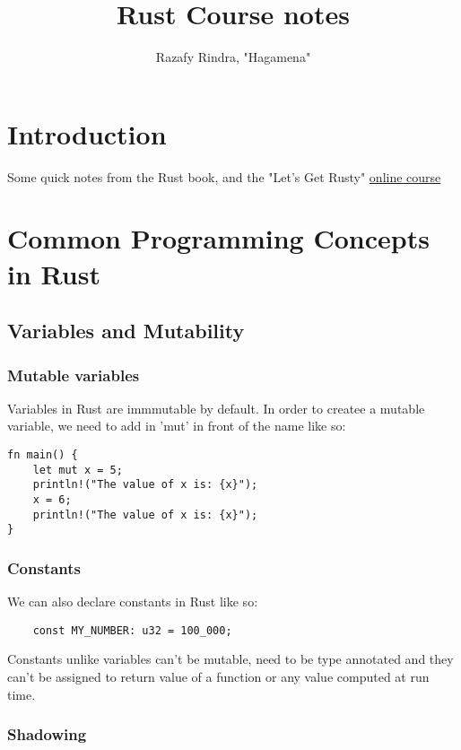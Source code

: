 
\title{Rust Course notes}
\author{Razafy Rindra, "Hagamena"}



\maketitle
\tableofcontents
\newpage
\section{Introduction}
Some quick notes from the Rust book, and the "Let's Get Rusty" \href{https://youtube.com/playlist?list=PLai5B987bZ9CoVR-QEIN9foz4QCJ0H2Y8}{online course}
\section{Common Programming Concepts in Rust}
\subsection{Variables and Mutability}
\subsubsection{Mutable variables} Variables in Rust are immmutable by default. In order to createe a mutable variable, we need to add in 'mut' in front of the name like so:
\begin{verbatim}
fn main() {
    let mut x = 5;
    println!("The value of x is: {x}");
    x = 6;
    println!("The value of x is: {x}");
}
\end{verbatim}
\subsubsection{Constants} We can also declare constants in Rust like so:\begin{verbatim}
    const MY_NUMBER: u32 = 100_000;
\end{verbatim}

Constants unlike variables can't be mutable, need to be type annotated and they can't be assigned to return value of a function or any value computed at run time.

\subsubsection{Shadowing}


